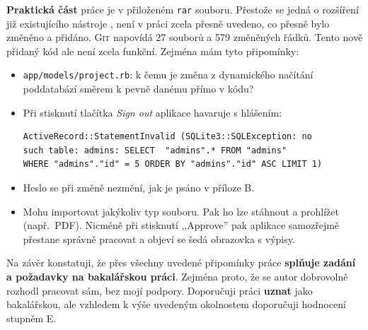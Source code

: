 \textbf{Praktická část} práce je v přiloženém \texttt{rar} souboru. Přestože
se jedná o rozšíření již existujícího nástroje \cdb, není v práci zcela přesně
uvedeno, co přesně bylo změněno a přidáno. \textsc{Git} napovídá 27 souborů a
579 změněných řádků. Tento nově přidaný kód ale není zcela funkční. Zejména
mám tyto připomínky:
\begin{itemize}
\item \texttt{app/models/project.rb}: k čemu je změna z dynamického načítání
poddatabází směrem k pevně danému přímo v kódu?
\item Při stisknutí tlačítka \emph{Sign out} aplikace havaruje s hlášením:
\begin{verbatim}
ActiveRecord::StatementInvalid (SQLite3::SQLException: no
such table: admins: SELECT  "admins".* FROM "admins"
WHERE "admins"."id" = 5 ORDER BY "admins"."id" ASC LIMIT 1)
\end{verbatim}
\item Heslo se při změně nezmění, jak je psáno v příloze B.
\item Mohu importovat jakýkoliv typ souboru. Pak ho lze stáhnout a prohlížet
(např.\ PDF). Nicméně při stisknutí ,,Approve'' pak aplikace samozřejmě
přestane správně pracovat a objeví se šedá obrazovka s výpisy.
\end{itemize}

Na závěr konstatuji, že přes všechny uvedené připomínky práce \textbf{splňuje
zadání a požadavky na bakalářskou práci}. Zejména proto, že se autor
dobrovolně rozhodl pracovat sám, bez mojí podpory. Doporučuji práci
\textbf{uznat} jako bakalářskou, ale vzhledem k výše uvedeným okolnostem
doporučuji hodnocení stupněm E.

\botinfo

